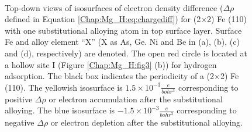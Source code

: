 \newpage
\begingroup
\begin{figure}[!ht]
  \centering
  \label{Chap:Mg_H:fig:9a}
  \label{Chap:Mg_H:fig:9b}
  \\
  \label{Chap:Mg_H:fig:9c}
  \label{Chap:Mg_H:fig:9d}
\caption[Top-down views of isosurfaces of electron density difference for (2$\times$2) Fe (110) with one substitutional alloying atom in top surface layer]{Top-down views of isosurfaces of electron density difference ($\Delta \rho$ defined in Equation \ref{Chap:Mg_H:eq:chargediff}) for (2$\times$2) Fe (110) with one substitutional alloying atom in top surface layer. Surface Fe and alloy element ``X'' (X as As, Ge. Ni and Be in (a), (b), (c) and (d), respectively) are denoted. The open red circle is located at a hollow site I (Figure \ref{Chap:Mg_H:fig3} (b)) for hydrogen adsorption. The black box indicates the periodicity of a (2$\times$2) Fe (110). The yellowish isosurface is $1.5\times10^{-3}\frac{e}{bohr^3}$ corresponding to positive $\Delta \rho$ or electron accumulation after the substitutional alloying. The blue isosurface is $-1.5\times10^{-3}\frac{e}{bohr^3}$ corresponding to negative $\Delta \rho$ or electron depletion after the substitutional alloying.}

\end{figure}

